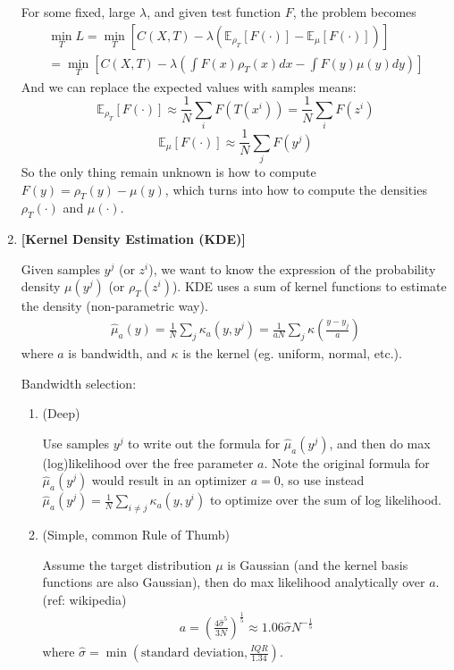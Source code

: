 \documentclass[11pt]{article}
\begin{document}
\begin{enumerate}
    For some fixed, large $\lambda$, and given test function $F$, the problem becomes
    \begin{align}
    \label{eq3}
        \min_T L 
        = \min_T \left[C(X,T) - \lambda (\mathbb{E}_{\rho_{T}} [F(\cdot)] - \mathbb{E}_{\mu} [F(\cdot)]) \right]\\
        = \min_T \left[C(X,T) - \lambda (\int F(x)\rho_T(x) dx - \int F(y)\mu(y) dy) \right]
    \end{align}
    And we can replace the expected values with samples means:
    $$
    \mathbb{E}_{\rho_{T}} [F(\cdot)] \approx \frac{1}{N} \sum_i F(T(x^i))
    = \frac{1}{N} \sum_i F(z^i)
    $$
    $$
    \mathbb{E}_{\mu} [F(\cdot)] \approx \frac{1}{N} \sum_j F(y^j)
    $$
    So the only thing remain unknown is how to compute $F(y) = \rho_T(y) - \mu(y)$, which turns into how to compute the densities $\rho_T(\cdot)$ and $\mu(\cdot)$.
    
    \item {\bf [Kernel Density Estimation (KDE)]}
    
    Given samples $y^j$ (or $z^i$), we want to know the expression of the probability density $\mu(y^j)$ (or $\rho_T(z^i)$). KDE uses a sum of kernel functions to estimate the density (non-parametric way).
    \begin{align*}
        \hat{\mu}_a(y) = \frac{1}{N} \sum_j \kappa_a(y,y^j)
        = \frac{1}{aN} \sum_j \kappa(\frac{y-y_j}{a})
    \end{align*}
    where $a$ is bandwidth, and $\kappa$ is the kernel (eg. uniform, normal, etc.).
    
    Bandwidth selection:
    \begin{enumerate}
        \item (Deep)
        
        Use samples $y^j$ to write out the formula for $\hat{\mu}_a(y^j)$, and then do max (log)likelihood over the free parameter $a$. Note the original formula for $\hat{\mu}_a(y^j)$ would result in an optimizer $a=0$, so use instead $\hat{\mu}_a(y^j) = \frac{1}{N} \sum_{i\ne j} \kappa_a(y,y^i)$ to optimize over the sum of log likelihood.
        
        \item (Simple, common Rule of Thumb)
        
        Assume the target distribution $\mu$ is Gaussian (and the kernel basis functions are also Gaussian), then do max likelihood analytically over $a$. (ref: wikipedia)
        \begin{align*}
            a = (\frac{4\hat{\sigma}^5}{3N})^{\frac{1}{5}} \approx
            1.06 \hat{\sigma} N^{-\frac{1}{5}}
        \end{align*}
        where $\hat{\sigma} = \min (\text{standard deviation}, \frac{IQR}{1.34})$.
    \end{enumerate}
    

\end{enumerate}
\end{document}
